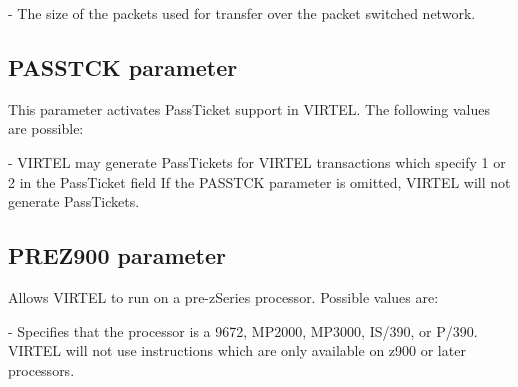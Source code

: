 \documentclass[letterpaper,10pt,english]{sphinxmanual}
\begin{document}
 - The size of the packets used for transfer over the packet switched network.

\label{\detokenize{Installation_Guide:virtvrrig-passtck}}
\ignorespaces 

\subsection{PASSTCK parameter}
\label{\detokenize{Installation_Guide:passtck-parameter}}\label{\detokenize{Installation_Guide:index-100}}
\begin{sphinxVerbatim}[commandchars=\\\{\}]
 
\end{sphinxVerbatim}

This parameter activates PassTicket support in VIRTEL. The following values are possible:

 - VIRTEL may generate PassTickets for VIRTEL transactions which specify 1 or 2 in the PassTicket field If the PASSTCK parameter is omitted, VIRTEL will not generate PassTickets.

\ignorespaces 

\subsection{PREZ900 parameter}
\label{\detokenize{Installation_Guide:prez900-parameter}}\label{\detokenize{Installation_Guide:index-101}}
\begin{sphinxVerbatim}[commandchars=\\\{\}]
 
\end{sphinxVerbatim}

Allows VIRTEL to run on a pre-zSeries processor. Possible values are:

 - Specifies that the processor is a 9672, MP2000, MP3000, IS/390, or P/390. VIRTEL will not use instructions which are only available on z900 or later processors.
\end{document}
